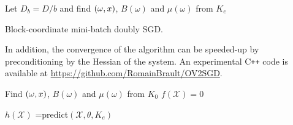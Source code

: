 \begin{center}
    \begin{algorithm2e}
        Let $D_b=D/b$ and find $(\omega, x)$, $B(\omega)$ and
        $\mu(\omega)$ from $K_e$\;
    \caption{Block-coordinate mini-batch doubly SGD. \label{alg:doubly_sgd}}
    \end{algorithm2e}
\end{center}
In addition, the convergence of the algorithm can be speeded-up by
preconditioning by the Hessian of the system. An experimental C{}\verb!++! code
is available at \url{https://github.com/RomainBrault/OV2SGD}.
\begin{center}
    \begin{algorithm2e}
        Find $(\omega, x)$, $B(\omega)$ and $\mu(\omega)$
        from $K_0$\; $f(\mathcal{X}) = 0$\;
        \caption{$h\left(\mathcal{X}\right)$ ={predict}$\left(\mathcal{X},
        \theta, K_e\right)$ \label{alg:ODSGD}}
    \end{algorithm2e}
\end{center}
